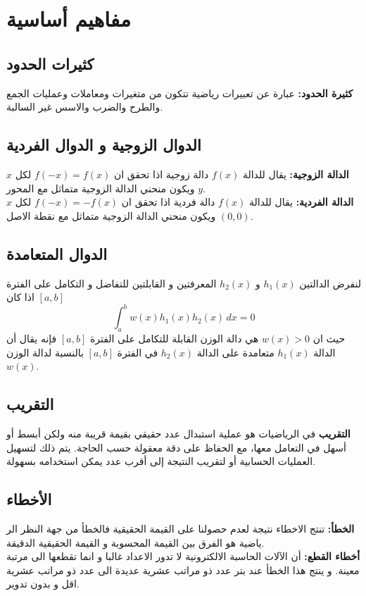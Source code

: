 \chapter{مفاهيم أساسية}

\section{كثيرات الحدود}
\textbf{كثيرة الحدود:} عبارة عن تعبيرات رياضية تتكون من متغيرات ومعاملات وعمليات الجمع والطرح
	والضرب والاسس غير السالبة.
	
\section{الدوال الزوجية و الدوال الفردية}
	\textbf{الدالة الزوجية:} يقال للدالة $f(x)$ دالة زوجية اذا تحقق ان $f(-x)=f(x)$ لكل $x$ ويكون منحني الدالة الزوجية متماثل مع المحور $y$.\\ [10pt]
	\textbf{الدالة الفردية:} يقال للدالة $f(x)$ دالة فردية اذا تحقق ان $f(-x)=-f(x)$ لكل $x$ ويكون منحني الدالة الزوجية متماثل مع نقطة الاصل $(0,0)$.


\section{الدوال المتعامدة}
	لنفرض الدالتين $h_1(x)$ و $h_2(x)$ المعرفتين و القابلتين للتفاضل و التكامل على الفترة $[a,b]$ اذا كان
	\[
	\int_{a}^{b} w(x) h_1(x) h_2(x) \, dx = 0
	\]
	حيث ان $w(x) > 0$ هي دالة الوزن القابلة للتكامل على الفترة $[a,b]$ فإنه يقال أن الدالة $h_1(x)$ متعامدة على الدالة $h_2(x)$ في الفترة $[a,b]$ بالنسبة لدالة الوزن $w(x)$. 

\section{التقريب}
\textbf{التقريب} في الرياضيات هو عملية استبدال عدد حقيقي بقيمة قريبة منه ولكن أبسط أو أسهل في التعامل معها، مع الحفاظ على دقة معقولة حسب الحاجة. يتم ذلك لتسهيل العمليات الحسابية أو لتقريب النتيجة إلى أقرب عدد يمكن استخدامه بسهولة.


\section{الأخطاء}
	\textbf{الخطأ:} تنتج الاخطاء نتيجة لعدم حصولنا على القيمة الحقيقية فالخطأ من جهة النظر الر ياضية هو الفرق بين القيمة المحسوبة و القيمة الحقيقية الدقيقة.\\ [10pt]
	\textbf{أخطاء القطع:} أن الآلات الحاسبة الالكترونية لا تدور الاعداد غالبا و انما تقطعها الى مرتبة معينة. و ينتج هذا الخطأ عند بتر عدد ذو مراتب عشرية عديدة الى عدد ذو مراتب عشرية اقل و بدون تدوير.

